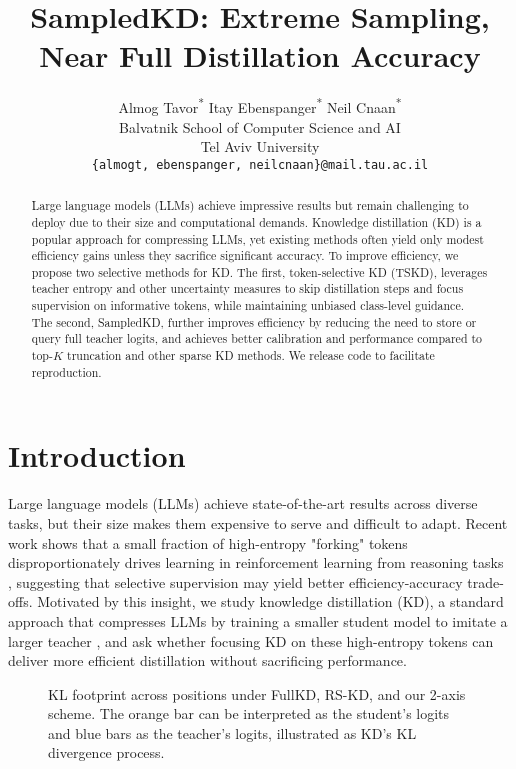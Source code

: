 \documentclass[11pt]{article}
\title{SampledKD: Extreme Sampling, Near Full Distillation Accuracy}
\author{
  Almog Tavor\textsuperscript{*} \qquad Itay Ebenspanger\textsuperscript{*} \qquad Neil Cnaan\textsuperscript{*} \\
  Balvatnik School of Computer Science and AI \\
  Tel Aviv University \\
  \texttt{\{almogt, ebenspanger, neilcnaan\}@mail.tau.ac.il} \\
}
\begin{document}
\maketitle
\let\thefootnote\relax
\footnotemark
{}
\begin{abstract}
	Large language models (LLMs) achieve impressive results but remain challenging to deploy due to their size and computational demands. Knowledge distillation (KD) is a popular approach for compressing LLMs, yet existing methods often yield only modest efficiency gains unless they sacrifice significant accuracy. To improve efficiency, we propose two selective methods for KD. The first, token-selective KD (TSKD), leverages teacher entropy and other uncertainty measures to skip distillation steps and focus supervision on informative tokens, while maintaining unbiased class-level guidance. The second, SampledKD, further improves efficiency by reducing the need to store or query full teacher logits, and achieves better calibration and performance compared to top-$K$ truncation and other sparse KD methods. We release code to facilitate reproduction.
\end{abstract}

\section{Introduction}

Large language models (LLMs) achieve state-of-the-art results across diverse tasks, but their size makes them expensive to serve and difficult to adapt.
Recent work shows that a small fraction of high-entropy "forking" tokens disproportionately drives learning in reinforcement learning from reasoning tasks \citep{wang2025highentropy}, suggesting that selective supervision may yield better efficiency-accuracy trade-offs.
Motivated by this insight, we study knowledge distillation (KD), a standard approach that compresses LLMs by training a smaller student model to imitate a larger teacher \citep{hinton2015distillation}, and ask whether focusing KD on these high-entropy tokens can deliver more efficient distillation without sacrificing performance.

\begin{figure}[t!]
	\begin{flushright}
		\resizebox{\columnwidth}{!}{}
	\end{flushright}
	\caption{KL footprint across positions under FullKD, RS-KD, and our 2-axis scheme. The orange bar can be interpreted as the student's logits and blue bars as the teacher's logits, illustrated as KD's KL divergence process.}
	\label{fig:kd_intuition}
\end{figure}
\end{document}
